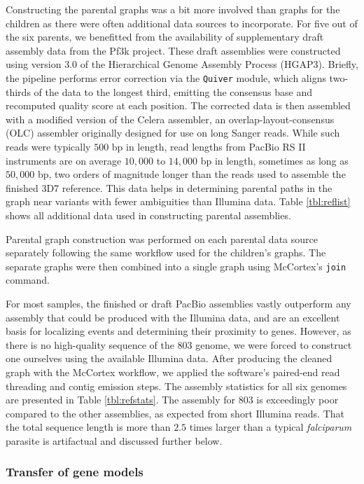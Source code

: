 Constructing the parental graphs was a bit more involved than graphs for the children as there were often additional data sources to incorporate.  For five out of the six parents, we benefitted from the availability of supplementary draft assembly data from the Pf3k project.  These draft assemblies were constructed using version $3.0$ of the Hierarchical Genome Assembly Process (HGAP$3$)\cite{Chin:2013iw}.  Briefly, the pipeline performs error correction via the \texttt{Quiver} module, which aligns two-thirds of the data to the longest third, emitting the consensus base and recomputed quality score at each position.  The corrected data is then assembled with a modified version of the Celera assembler\cite{Myers:1995vm}, an overlap-layout-consensus (OLC) assembler originally designed for use on long Sanger reads.  While such reads were typically $500$ bp in length, read lengths from PacBio RS II instruments are on average $10,000$ to $14,000$ bp in length, sometimes as long as $50,000$ bp, two orders of magnitude longer than the reads used to assemble the finished 3D7 reference.  This data helps in determining parental paths in the graph near variants with fewer ambiguities than Illumina data.  Table \ref{tbl:reflist} shows all additional data used in constructing parental assemblies.

Parental graph construction was performed on each parental data source separately following the same workflow used for the children's graphs.  The separate graphs were then combined into a single graph using McCortex's \texttt{join} command.

For most samples, the finished or draft PacBio assemblies vastly outperform any assembly that could be produced with the Illumina data, and are an excellent basis for localizing events and determining their proximity to genes.  However, as there is no high-quality sequence of the $803$ genome, we were forced to construct one ourselves using the available Illumina data.  After producing the cleaned graph with the McCortex workflow, we applied the software's paired-end read threading and contig emission steps.  The assembly statistics for all six genomes are presented in Table \ref{tbl:refstats}.  The assembly for $803$ is exceedingly poor compared to the other assemblies, as expected from short Illumina reads.  That the total sequence length is more than $2.5$ times larger than a typical \textit{falciparum} parasite is artifactual and discussed further below.

\subsubsection{Transfer of gene models}

